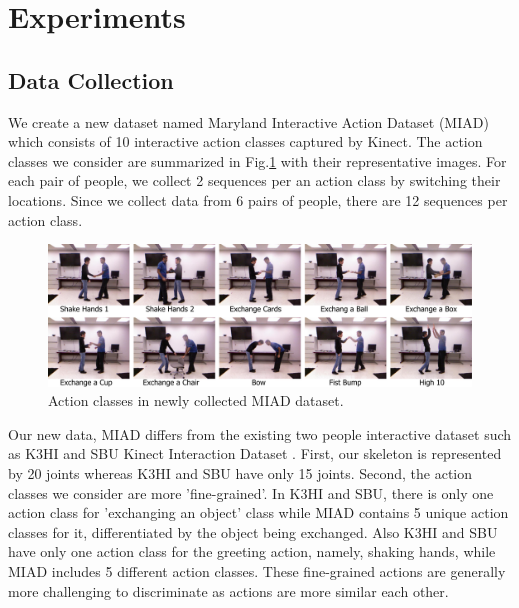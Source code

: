 \documentclass[10pt,twocolumn,letterpaper]{article}
\begin{document}


\section{Experiments}

\subsection{Data Collection}

We create a new dataset named Maryland Interactive Action Dataset (MIAD) which consists of 10 interactive action classes captured by Kinect. The action classes we consider are summarized in Fig.\ref{fig:newactions} with their representative images. For each pair of people, we collect 2 sequences per an action class by switching their locations. Since we collect data from 6 pairs of people, there are 12 sequences per action class. 

\begin{figure}[htb]
\begin{center}
\includegraphics[width=6.8in]{newactions.pdf}
\caption{Action classes in newly collected MIAD dataset.  \label{fig:newactions}}
\end{center}
\end{figure}

Our new data, MIAD differs from the existing two people interactive dataset such as K3HI \cite{K3HI} and SBU Kinect Interaction Dataset \cite{Yun2012}. First, our skeleton is represented by 20 joints whereas K3HI and SBU have only 15 joints. Second, the action classes we consider are more 'fine-grained'. In K3HI and SBU, there is only one action class for 'exchanging an object' class while MIAD contains 5 unique action classes for it, differentiated by the object being exchanged. Also K3HI and SBU have only one action class for the greeting action, namely, shaking hands, while MIAD includes 5 different action classes. These fine-grained actions are generally more challenging to discriminate as actions are more similar each other.
\end{document}
